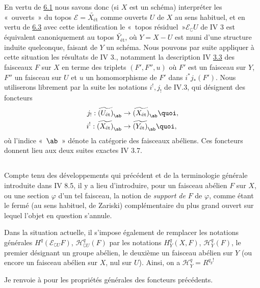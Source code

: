 \documentclass[10pt]{../fichiers-configuration-latex/smfart}
\begin{document}
En vertu de \hyperref[VIII.prop6.1]{6.1} nous savons donc (si $X$ est un
schéma) interpréter les « ouverts » du topos $ℰ =
\widetilde{X_{\text{ét}}}$ comme ouverts $U$ de $X$ au sens
habituel, et en vertu de \hyperref[VIII.thm6.3]{6.3} avec cette identification
le « topos résiduel »\pageoriginale $ℰ_\complement U$ de
IV 3 est équivalent canoniquement au topos
$\widetilde{Y_{\text{ét}}}$, où $Y = X - U$ est muni d'une structure
induite quelconque, faisant de $Y$ un schéma. Nous pouvons par suite
appliquer à cette situation les résultats de IV 3., notamment la
description IV \hyperref[VIII.def3.3]{3.3} des faisceaux $F$ sur $X$ en terme
des triplets $(F', F'', u)$ où $F'$ est un faisceau sur $Y$, $F''$
un faisceau sur $U$ et $u$ un homomorphisme de $F'$ dans $i^{\ast}
j_{\ast} (F')$. Nous utiliserons librement par la suite les
notations $i^{!}, j_{!}$ de IV.3, qui désignent des foncteurs
\begin{align*}
j_{!} : \widetilde{(U_{\text{ét}})}_{\ab} &\to
\widetilde{(X_{\text{ét}})}_{\ab}{\quoi},\\
i^{!} : \widetilde{(X_{\text{ét}})}_{\ab} &\to
\widetilde{(Y_{\text{ét}})}_{\ab}{\quoi},
\end{align*}
où l'indice « $\ab$ » dénote la catégorie des faisceaux
abéliens. Ces
foncteurs donnent lieu aux deux suites exactes IV 3.7.

\subsection{}

Compte tenu des développements qui précédent et de la terminologie
générale introduite dans IV 8.5, il y a lieu d'introduire, pour un
faisceau abélien $F$ sur $X$, ou une section $\varphi$ d'un tel
faisceau, la notion de \emph{support de} $F$ \resp de $\varphi$, comme
étant le fermé (au sens habituel, \ie de Zariski) complémentaire du
plus grand ouvert sur lequel l'objet en question s'annule.

Dans la situation actuelle, il s'impose également de remplacer les
notations générales  $H^q (ℰ_{\complement U} F)$,
$ℋ^q_{\complement U} (F)$ par les notations $H^{q}_Y (X, F)$,
$ℋ^{q}_Y (F)$, le premier désignant un groupe abélien, le deuxième
un faisceau abélien sur $Y$ (ou encore un faisceau abélien sur $X$,
nul sur $U$). Ainsi, on a $ℋ^{q}_Y  = R^{q_{y}!}$ \etc

Je renvoie à  pour les propriétés générales des foncteurs
précédents.
\end{document}
